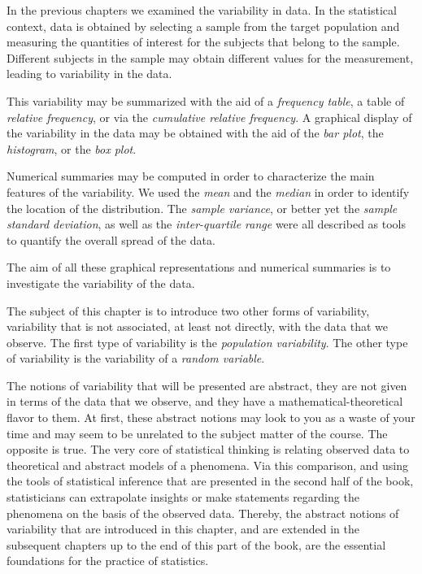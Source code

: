 \documentclass[]{krantz}
\theoremstyle{definition}
\theoremstyle{definition}
\theoremstyle{definition}
\theoremstyle{remark}
\begin{document}
In the previous chapters we examined the variability in data. In the
statistical context, data is obtained by selecting a sample from the
target population and measuring the quantities of interest for the
subjects that belong to the sample. Different subjects in the sample may
obtain different values for the measurement, leading to variability in
the data.

This variability may be summarized with the aid of a \emph{frequency
table}, a table of \emph{relative frequency}, or via the
\emph{cumulative relative frequency}. A graphical display of the
variability in the data may be obtained with the aid of the \emph{bar
plot}, the \emph{histogram}, or the \emph{box plot}.

Numerical summaries may be computed in order to characterize the main
features of the variability. We used the \emph{mean} and the
\emph{median} in order to identify the location of the distribution. The
\emph{sample variance}, or better yet the \emph{sample standard
deviation}, as well as the \emph{inter-quartile range} were all
described as tools to quantify the overall spread of the data.

The aim of all these graphical representations and numerical summaries
is to investigate the variability of the data.

The subject of this chapter is to introduce two other forms of
variability, variability that is not associated, at least not directly,
with the data that we observe. The first type of variability is the
\emph{population variability}. The other type of variability is the
variability of a \emph{random variable}.

The notions of variability that will be presented are abstract, they are
not given in terms of the data that we observe, and they have a
mathematical-theoretical flavor to them. At first, these abstract
notions may look to you as a waste of your time and may seem to be
unrelated to the subject matter of the course. The opposite is true. The
very core of statistical thinking is relating observed data to
theoretical and abstract models of a phenomena. Via this comparison, and
using the tools of statistical inference that are presented in the
second half of the book, statisticians can extrapolate insights or make
statements regarding the phenomena on the basis of the observed data.
Thereby, the abstract notions of variability that are introduced in this
chapter, and are extended in the subsequent chapters up to the end of
this part of the book, are the essential foundations for the practice of
statistics.
\end{document}

